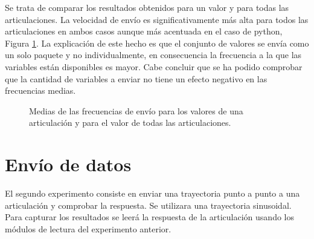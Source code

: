 \documentclass[12pt,a4paper,final,twoside]{book}
\begin{document}
Se trata de comparar los resultados obtenidos para un valor y para todas las articulaciones. La velocidad de envío es significativamente más alta para todos las articulaciones en ambos casos aunque más acentuada en el caso de python, Figura \ref{fig:compAllOne}. La explicación de este hecho es que el conjunto de valores se envía como un solo paquete y no individualmente, en consecuencia la frecuencia a la que las variables están disponibles es mayor. Cabe concluir que se ha podido comprobar que la cantidad de variables a enviar no tiene un efecto negativo en las frecuencias medias.
\begin{figure}[H]
	\centering
{}
	 \caption{Medias de las frecuencias de envío para los valores de una articulación y para el valor de todas las articulaciones.}
  \label{fig:compAllOne}
\end{figure}



\section{Envío de datos}\label{secenvdades}
El segundo experimento consiste en enviar una trayectoria punto a punto a una articulación y comprobar la respuesta. Se utilizara una trayectoria sinusoidal. Para capturar los resultados se leerá la respuesta de la articulación usando los módulos de lectura del experimento anterior.  
\end{document}
